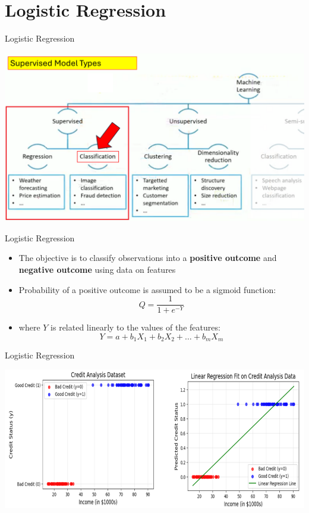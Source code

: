\documentclass[11pt]{beamer}
\begin{document}
\section{Logistic Regression}
\begin{frame}{Logistic Regression}
	\begin{center}
	\includegraphics[scale=.35]{../05-pictures/lesson-3-1_pic_7.png}
	\end{center}
\end{frame}
\begin{frame}{Logistic Regression}
	\begin{itemize}
		\item The objective is to classify observations into a \textbf{positive outcome} and \textbf{negative outcome} using data on features
		\item Probability of a positive outcome is assumed to be a sigmoid function: \begin{equation} Q = \frac{1}{1+e^{-Y}}\end{equation}
		\item    where $Y$ is related linearly to the values of the features: \begin{equation}Y=a+b_1X_1 + b_2X_2 + \dots + b_mX_m\end{equation}
	\end{itemize}
\end{frame}
\begin{frame}{Logistic Regression}
	\begin{center}
	\includegraphics[scale=.45]{../05-pictures/lesson-3-1_pic_8.png}
	\end{center}
\end{frame}
\end{document}
